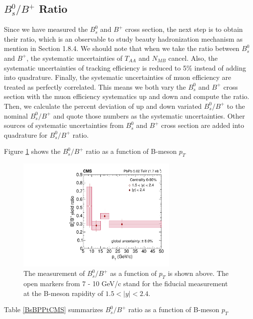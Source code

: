 \subsection{$B^0_s/B^{+}$ Ratio}

Since we have measured the $B^0_s$ and $B^+$ cross section, the next step is to obtain their ratio, which is an observable to study beauty hadronization mechanism as mention in Section 1.8.4. We should note that when we take the ratio between $B^0_s$ and $B^+$, the systematic uncertainties of $T_{AA}$ and $N_{MB}$ cancel. Also, the systematic uncertainties of tracking efficiency is reduced to 5\% instead of adding into quadrature. Finally, the systematic uncertainties of muon efficiency are treated as perfectly correlated. This means we both vary the $B^0_s$ and $B^+$ cross section with the muon efficiency systematics up and down and compute the ratio. Then, we calculate the percent deviation of up and down variated $B^0_s/B^+$ to the nominal $B^0_s/B^+$ and quote those numbers as the systematic uncertainties. Other sources of systematic uncertainties from $B^0_s$ and $B^+$ cross section are added into quadrature for $B^0_s/B^+$ ratio. 

Figure \ref{BsBPPtDataONLY} shows the $B^0_s/B^+$ ratio as a function of B-meson $p_T$



\begin{figure}[hbtp]
\begin{center}
\includegraphics[width=0.70\textwidth]{Figures/Chapter5/ratio_vsPt_ref0_0.pdf}
\caption{The measurement of $B^0_s/B^+$ as a function of $p_T$ is shown above. The open markers from 7 - 10 GeV/c stand for the fiducial measurement at the B-meson rapidity of $1.5 < |y| < 2.4$.}
\label{BsBPPtDataONLY}
\end{center}
\end{figure}

Table \ref{BsBPPtCMS} summarizes $B^0_s/B^+$ ratio as a function of B-meson $p_T$


